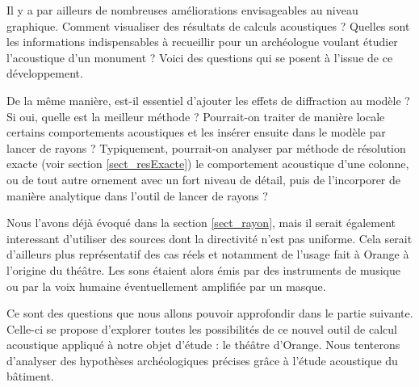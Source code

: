 Il y a par ailleurs de nombreuses améliorations envisageables au niveau graphique. Comment visualiser des résultats de calculs acoustiques ? Quelles sont les informations indispensables à recueillir pour un archéologue voulant étudier l'acoustique d'un monument ? Voici des questions qui se posent à l'issue de ce développement.

De la même manière, est-il essentiel d'ajouter les effets de diffraction au modèle ? Si oui, quelle est la meilleur méthode ? Pourrait-on traiter de manière locale certains comportements acoustiques et les insérer ensuite dans le modèle par lancer de rayons ? Typiquement, pourrait-on analyser par méthode de résolution exacte (voir section \ref{sect_resExacte}) le comportement acoustique d'une colonne, ou de tout autre ornement avec un fort niveau de détail, puis de l'incorporer de manière analytique dans l'outil de lancer de rayons ? 

Nous l'avons déjà évoqué dans la section \ref{sect_rayon}, mais il serait également interessant d'utiliser des sources dont la directivité n'est pas uniforme. Cela serait d'ailleurs plus représentatif des cas réels et notamment de l'usage fait à Orange à l'origine du théâtre. Les sons étaient alors émis par des instruments de musique ou par la voix humaine éventuellement amplifiée par un masque.

Ce sont des questions que nous allons pouvoir approfondir dans le partie suivante. Celle-ci se propose d'explorer toutes les possibilités de ce nouvel outil de calcul acoustique appliqué à notre objet d'étude : le théâtre d'Orange. Nous tenterons d'analyser des hypothèses archéologiques précises grâce à l'étude acoustique du bâtiment.



\newpage
	
 
 
